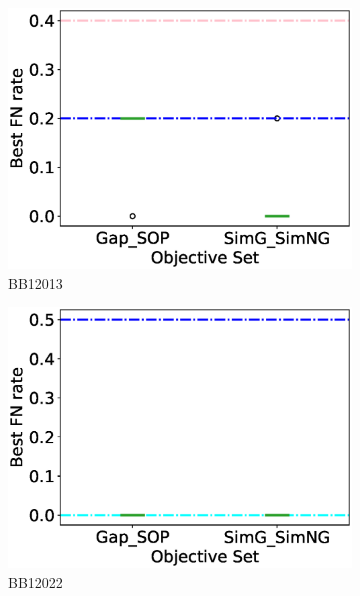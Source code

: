 \begin{figure}[!htbp]
\begin{adjustwidth}{-1cm}{-1cm}
\begin{subfigure}{0.22\textwidth}
			\includegraphics[width=\columnwidth]{Figure/summary/precomputedInit/Balibase/BB12013_objset_fnrate_rank}
			\caption{BB12013}
		\end{subfigure}
		\begin{subfigure}{0.22\textwidth}
			\includegraphics[width=\columnwidth]{Figure/summary/precomputedInit/Balibase/BB12022_objset_fnrate_rank}
			\caption{BB12022}
		\end{subfigure}
		\begin{subfigure}{0.22\textwidth}

\end{subfigure}
\end{adjustwidth}
\end{figure}
